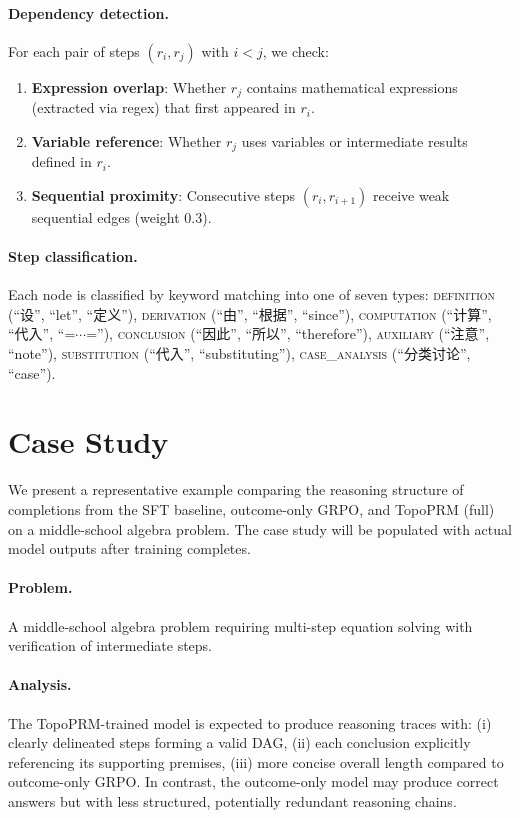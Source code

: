 \paragraph{Dependency detection.}
For each pair of steps $(r_i, r_j)$ with $i < j$, we check:
\begin{enumerate}[leftmargin=*,itemsep=1pt]
    \item \textbf{Expression overlap}: Whether $r_j$ contains mathematical
    expressions (extracted via regex) that first appeared in $r_i$.
    \item \textbf{Variable reference}: Whether $r_j$ uses variables or
    intermediate results defined in $r_i$.
    \item \textbf{Sequential proximity}: Consecutive steps $(r_i, r_{i+1})$
    receive weak sequential edges (weight 0.3).
\end{enumerate}

\paragraph{Step classification.}
Each node is classified by keyword matching into one of seven types:
\textsc{definition} (``设'', ``let'', ``定义''),
\textsc{derivation} (``由'', ``根据'', ``since''),
\textsc{computation} (``计算'', ``代入'', ``=$\cdots$=''),
\textsc{conclusion} (``因此'', ``所以'', ``therefore''),
\textsc{auxiliary} (``注意'', ``note''),
\textsc{substitution} (``代入'', ``substituting''),
\textsc{case\_analysis} (``分类讨论'', ``case'').

\section{Case Study}
\label{app:case_study}

We present a representative example comparing the reasoning structure
of completions from the SFT baseline, outcome-only GRPO, and TopoPRM
(full) on a middle-school algebra problem. The case study will be
populated with actual model outputs after training completes.

\paragraph{Problem.}
A middle-school algebra problem requiring multi-step equation solving
with verification of intermediate steps.

\paragraph{Analysis.}
The TopoPRM-trained model is expected to produce reasoning traces with:
(i) clearly delineated steps forming a valid DAG,
(ii) each conclusion explicitly referencing its supporting premises,
(iii) more concise overall length compared to outcome-only GRPO.
In contrast, the outcome-only model may produce correct answers but with
less structured, potentially redundant reasoning chains.

